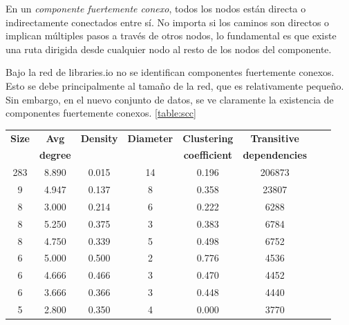 En un \textit{componente fuertemente conexo}, todos los nodos están directa o indirectamente conectados
entre sí. No importa si los caminos son directos o implican múltiples pasos a través de otros nodos,
lo fundamental es que existe una ruta dirigida desde cualquier nodo al resto de los nodos del componente.

Bajo la red de libraries.io no se identifican componentes fuertemente conexos. Esto se debe principalmente
al tamaño de la red, que es relativamente pequeño. Sin embargo, en el nuevo conjunto de datos, se ve claramente
la existencia de componentes fuertemente conexos. \ref{table:scc}

\begin{table}
    \begin{tabular}{|c|c|c|c|c|c|c|c|}
        \hline
        \textbf{Size} & \textbf{Avg}    & \textbf{Density} & \textbf{Diameter} & \textbf{Clustering}  & \textbf{Transitive}   \\
                      & \textbf{degree} &                  &                   & \textbf{coefficient} & \textbf{dependencies} \\
        \hline
        283           & 8.890           & 0.015            & 14                & 0.196                & 206873                \\
        9             & 4.947           & 0.137            & 8                 & 0.358                & 23807                 \\
        8             & 3.000           & 0.214            & 6                 & 0.222                & 6288                  \\
        8             & 5.250           & 0.375            & 3                 & 0.383                & 6784                  \\
        8             & 4.750           & 0.339            & 5                 & 0.498                & 6752                  \\
        6             & 5.000           & 0.500            & 2                 & 0.776                & 4536                  \\
        6             & 4.666           & 0.466            & 3                 & 0.470                & 4452                  \\
        6             & 3.666           & 0.366            & 3                 & 0.448                & 4440                  \\
        5             & 2.800           & 0.350            & 4                 & 0.000                & 3770                  \\

\end{tabular}
\end{table}
